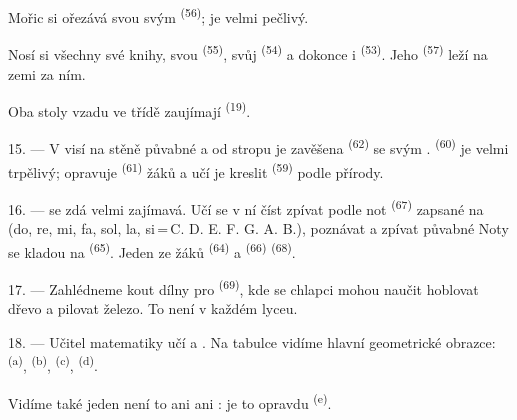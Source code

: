 Mořic si ořezává svou  svým  \textsuperscript{(56)}; je velmi
pečlivý.

Nosí si všechny své knihy, svou  \textsuperscript{(55)}, svůj
 \textsuperscript{(54)} a dokonce i 
\textsuperscript{(53)}. Jeho  \textsuperscript{(57)} leží na zemi za
ním.

Oba stoly vzadu ve třídě zaujímají  \textsuperscript{(19)}.

\VUsaut{4.6mm}
\VUsaut{3.4mm}

15. --- V  visí na stěně půvabné  a od stropu je zavěšena
 \textsuperscript{(62)} se svým .
 \textsuperscript{(60)} je velmi trpělivý; opravuje 
\textsuperscript{(61)} žáků a učí je kreslit  \textsuperscript{(59)} podle
přírody.

16. ---  se zdá velmi zajímavá. Učí se v ní číst
 zpívat podle not  \textsuperscript{(67)}
zapsané na  (do, re, mi, fa, sol, la, si\,=\,C. D. E. F. G. A. B.), poznávat
 a zpívat půvabné
 Noty se kladou na  \textsuperscript{(65)}. Jeden ze
žáků  \textsuperscript{(64)} a 
\textsuperscript{(66)}  \textsuperscript{(68)}.

17. --- Zahlédneme kout dílny pro  \textsuperscript{(69)}, kde se chlapci
mohou naučit hoblovat dřevo a pilovat železo. To není v každém lyceu.

\VUsaut{5.0mm}
\VUsaut{3.6mm}

18. --- Učitel matematiky učí   a
. Na tabulce vidíme hlavní geometrické obrazce:
 \textsuperscript{(a)},  \textsuperscript{(b)},
 \textsuperscript{(c)},  \textsuperscript{(d)}.

Vidíme také jeden  není to  ani  ani
: je to opravdu  \textsuperscript{(e)}.

